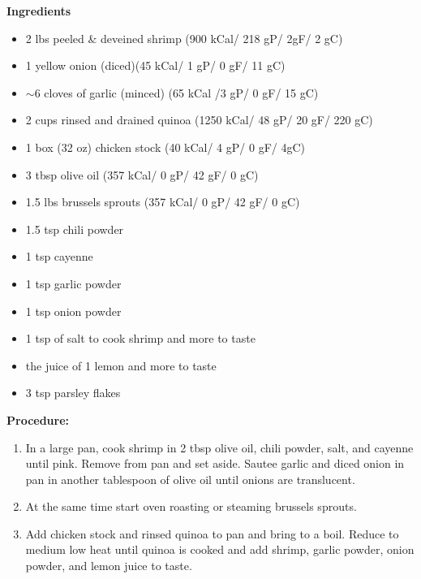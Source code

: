 \begin{multicols}{2}
\textbf{Ingredients}
\begin{itemize}
\item 2 lbs peeled \& deveined shrimp \newline(900 kCal/ 218 gP/ 2gF/ 2 gC)
\item 1 yellow onion (diced)\quad (45 kCal/ 1 gP/ 0 gF/ 11 gC)
\item $\sim 6$ cloves of garlic (minced) (65 kCal /3 gP/ 0 gF/ 15 gC)
\item 2 cups rinsed and drained quinoa \quad (1250 kCal/ 48 gP/ 20 gF/ 220 gC)
\item 1 box (32 oz) chicken stock \quad (40 kCal/ 4 gP/ 0 gF/ 4gC)
\item 3 tbsp olive oil \quad (357 kCal/ 0 gP/ 42 gF/ 0 gC)
\item 1.5 lbs brussels sprouts (357 kCal/ 0 gP/ 42 gF/ 0 gC)
\item 1.5 tsp chili powder
\item 1 tsp cayenne 
\item 1 tsp garlic powder
\item 1 tsp onion powder 
\item 1 tsp of salt to cook shrimp and more to taste
\item the juice of 1 lemon and more to taste 
\item 3 tsp parsley flakes 





\end{itemize}


\columnbreak
\textbf{Procedure:}
\medskip


\begin{enumerate}
\item In a large pan, cook shrimp in 2 tbsp olive oil, chili powder, salt, and cayenne until pink. Remove from pan and set aside. Sautee garlic and diced onion in pan in another tablespoon of olive oil until onions are translucent. 

\medskip

\item At the same time start oven roasting or steaming brussels sprouts. 

\medskip

\item Add chicken stock and rinsed quinoa to pan and bring to a boil. Reduce to medium low heat until quinoa is cooked and add shrimp, garlic powder, onion powder, and lemon juice to taste. 




\end{enumerate}
\end{multicols}
